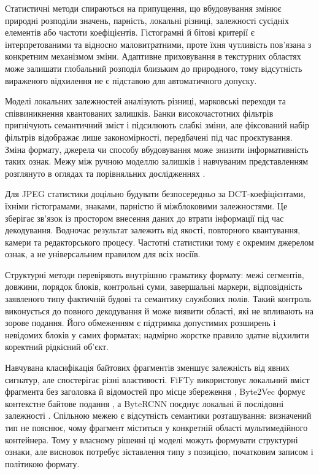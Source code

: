 Статистичні методи спираються на припущення, що вбудовування змінює природні розподіли значень, парність, локальні різниці, залежності сусідніх елементів або частоти коефіцієнтів. Гістограмні й бітові критерії є інтерпретованими та відносно маловитратними, проте їхня чутливість пов’язана з конкретним механізмом зміни. Адаптивне приховування в текстурних областях може залишати глобальний розподіл близьким до природного, тому відсутність вираженого відхилення не є підставою для автоматичного допуску.

Моделі локальних залежностей аналізують різниці, марковські переходи та співвиникнення квантованих залишків. Банки високочастотних фільтрів пригнічують семантичний зміст і підсилюють слабкі зміни, але фіксований набір фільтрів відображає лише закономірності, передбачені під час проєктування. Зміна формату, джерела чи способу вбудовування може знизити інформативність таких ознак. Межу між ручною моделлю залишків і навчуваним представленням розглянуто в оглядах та порівняльних дослідженнях \cite{kheddar2024review,muralidharan2022race,kuznetsov2024deep}.

Для JPEG статистики доцільно будувати безпосередньо за DCT-коефіцієнтами, їхніми гістограмами, знаками, парністю й міжблоковими залежностями. Це зберігає зв’язок із простором внесення даних до втрати інформації під час декодування. Водночас результат залежить від якості, повторного квантування, камери та редакторського процесу. Частотні статистики тому є окремим джерелом ознак, а не універсальним правилом для всіх носіїв.

Структурні методи перевіряють внутрішню граматику формату: межі сегментів, довжини, порядок блоків, контрольні суми, завершальні маркери, відповідність заявленого типу фактичній будові та семантику службових полів. Такий контроль виконується до повного декодування й може виявити області, які не впливають на зорове подання. Його обмеженням є підтримка допустимих розширень і невідомих блоків у самих форматах; надмірно жорстке правило здатне відхилити коректний рідкісний об’єкт.

Навчувана класифікація байтових фрагментів зменшує залежність від явних сигнатур, але спостерігає різні властивості. FiFTy використовує локальний вміст фрагмента без заголовка й відомостей про місце збереження \cite{mittal2021fifty}, Byte2Vec формує контекстне байтове подання \cite{haque2022byteembeddings}, а ByteRCNN поєднує локальні й послідовні залежності \cite{skracic2023bytercnn}. Спільною межею є відсутність семантики розташування: визначений тип не пояснює, чому фрагмент міститься у конкретній області мультимедійного контейнера. Тому у власному рішенні ці моделі можуть формувати структурні ознаки, але висновок потребує зіставлення типу з позицією, початковим записом і політикою формату.


